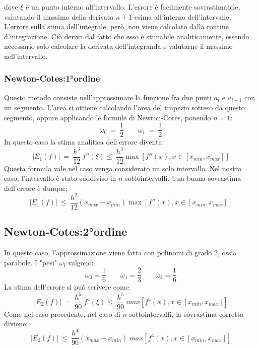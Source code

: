  dove $\xi$ è un punto interno all'intervallo. L'errore è facilmente sovrastimabile, valutando il massimo della derivata $n+1$-esima all'interno dell'intervallo. L'errore sulla stima dell'integrale,
però, non viene calcolato dalla routine d'integrazione. Ciò deriva dal fatto che esso è stimabile analiticamente,
essendo necessario solo calcolare la derivata dell'integranda e valutarne il massimo nell'intervallo.

\subsubsection{Newton-Cotes:1°ordine}
Questo metodo consiste nell'approssimare la funzione fra due punti $a_i$ e $a_{i+1}$ con un segmento.
L'area si ottiene calcolando l'area del trapezio sotteso da questo segmento, oppure applicando le formule di Newton-Cotes, ponendo $ n = 1$: 
$$
\omega_0 \ = \ \frac{1}{2} \qquad \omega_1 \ = \ \frac{1}{2}
$$
In questo caso la stima analitica dell'errore diventa:
$$
| E_1(f) |  \ = \ \frac{h^3}{12} \ f''(\xi) \leq \  \frac{h^3}{12} \max \left[ f''(x), x \in [x_{min},x_{max}] \right]
$$
Questa formula vale nel caso venga considerato un solo intervallo. Nel nostro caso, l'intervallo è stato suddiviso in $n$ sottointervalli. Una buona sovrastima dell'errore è dunque:
$$
| E_1(f) |  \ \leq \ \frac{h^2}{12}\left( x_{max} - x_{min} \right) \max \left[ f''(x), x \in [x_{min},x_{max}] \right]
$$
\subsection{Newton-Cotes:2°ordine}
In questo caso, l'approssimazione viene fatta con polinomi di grado 2, ossia parabole.
I "pesi" $\omega_i$ valgono:
$$
	\omega_0 = \frac{1}{6} \qquad  \omega_1 = \frac{2}{3} \qquad \omega_2 = \frac{1}{6}
$$
La stima dell'errore si può scrivere come:
$$
|E_2 (f) | \ = \  \frac{h^5}{90} \ f^4(\xi) \leq \ \frac{h^5}{90} \ max \left[ f^4( x), x \in [x_{min},x_{max}] \right]
$$
Come nel caso precedente, nel caso di $n$ sottointervalli, la sovrastima corretta diviene:
$$
|E_2 (f) | \ \leq \ \frac{h^4}{90} \left( x_{max} - x_{min} \right) \ max \left[ f^4( x), x \in [x_{min},x_{max}] \right]
$$

